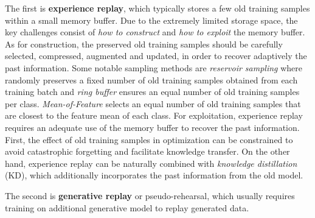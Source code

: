 The first is \textbf{experience replay}, which typically stores a few old training samples within a small memory buffer. Due to the extremely limited storage space, the key challenges consist of \textit{how to construct} and \textit{how to exploit} the memory buffer.  As for construction, the preserved old training samples should be carefully selected, compressed, augmented and updated, in order to recover adaptively the past information.  Some notable sampling methods are \textit{reservoir sampling} where randomly preserves a fixed number of old training samples obtained from each training batch and \textit{ring buffer} ensures an equal number of old training samples per class.  \textit{Mean-of-Feature} selects an equal number of old training samples that are closest to the feature mean of each class.  For exploitation, experience replay requires an adequate use of the memory buffer to recover the past information.  First, the effect of old training samples in optimization can be constrained to avoid catastrophic forgetting and facilitate knowledge transfer.  On the other hand, experience replay can be naturally combined with \textit{knowledge distillation} (KD), which additionally incorporates the past information from the old model. 

The second is \textbf{generative replay} or pseudo-rehearsal, which usually requires training on additional generative model to replay generated data. 